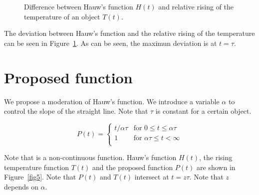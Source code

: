 \documentclass[12pt]{article}
\def\hf{0.45\textwidth}
\begin{document}
\begin{figure}[!ht]
\centering
{}
\caption{Difference between Hauw's function $H(t)$ and relative rising of the temperature of an object $T(t)$.}
\label{fig4}
\end{figure}

The deviation between Hauw's function and the relative rising of the temperature can be seen in Figure~\ref{fig4}. As can be seen, the maximun deviation is at $t=\tau$.

\section{Proposed function}
We propose a moderation of Hauw's function. We introduce a variable $\alpha$ to control the slope of the straight line. Note that $\tau$ is constant for a certain object.

\begin{equation}
P(t) = \begin{cases}
t/\alpha\tau & \text{for } 0\leq t\leq \alpha\tau\\
1      & \text{for } \alpha\tau\leq t < \infty\\
\end{cases}
\end{equation}

Note that is a non-continuous function.
Hauw's function $H(t)$, the rising temperature function $T(t)$ and the proposed function $P(t)$ are shown in Figure~\ref{fig5}. Note that $P(t)$ and $T(t)$ intersect at $t=z\tau$. Note that $z$ depends on $\alpha$.
\end{document}
